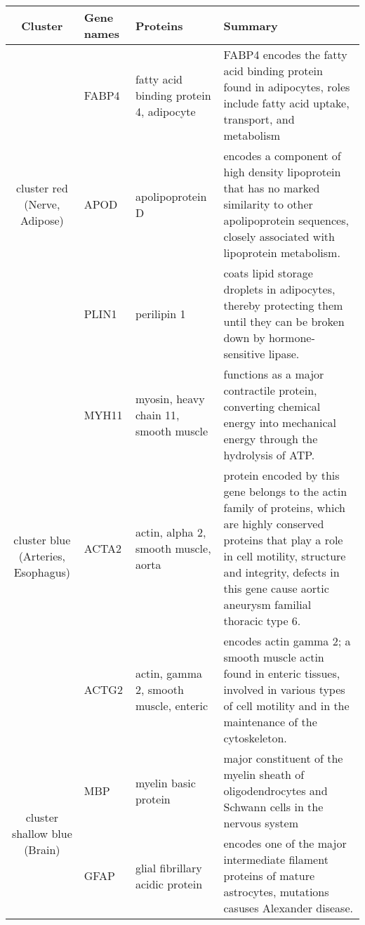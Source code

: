 \clearpage
\begin{table}[htdp]
\begin{center}
\begin{tabular}{|c|p{0.5in}|p{1.4in}|p{3.6in}|} 
\hline
Cluster & Gene names & Proteins  & Summary \\
\hline

 \multirow{3}{4em}{\small{cluster red (Nerve, Adipose)} } &  \small{FABP4} & \footnotesize{ fatty acid binding protein 4, adipocyte} & \scriptsize{FABP4 encodes the fatty acid binding protein found in adipocytes, roles include fatty acid uptake, transport, and metabolism}\\ 
 					      & \small{APOD} & \footnotesize{apolipoprotein D} & \scriptsize{encodes a component of high density lipoprotein that has no marked similarity to other apolipoprotein sequences, closely associated with lipoprotein metabolism.}\\
					      & \small{PLIN1} & \footnotesize{perilipin} 1 & \scriptsize{coats lipid storage droplets in adipocytes, thereby protecting them until they can be broken down by hormone-sensitive lipase.} \\
 \hline
 \multirow{3}{4em}{\small{cluster blue (Arteries, Esophagus)} } & \small{MYH11} & \footnotesize{myosin, heavy chain 11, smooth muscle} & \scriptsize{functions as a major contractile protein, converting chemical energy into mechanical energy through the hydrolysis of ATP.} \\
 					    & \small{ACTA2} & \footnotesize{actin, alpha 2, smooth muscle, aorta} & \scriptsize{protein encoded by this gene belongs to the actin family of proteins, which are highly conserved proteins that play a role in cell motility, structure and integrity, defects in this gene cause aortic aneurysm familial thoracic type 6.}\\
					    &  \small{ACTG2} & \footnotesize{actin, gamma 2, smooth muscle, enteric} & \scriptsize{encodes actin gamma 2; a smooth muscle actin found in enteric tissues, involved in various types of cell motility and in the maintenance of the cytoskeleton. }\\
 \hline
 \multirow{3}{4em}{\small{cluster shallow blue (Brain)}} & \small{MBP} & \footnotesize{myelin basic protein} & \scriptsize{major constituent of the myelin sheath of oligodendrocytes and Schwann cells in the nervous system} \\
 					    & \small{GFAP} & \footnotesize{glial fibrillary acidic protein} & \scriptsize{encodes one of the major intermediate filament proteins of mature astrocytes, mutations casuses Alexander disease.} \\

\end{tabular}
\end{center}
\end{table}
